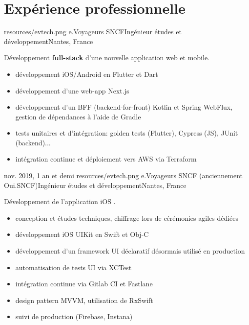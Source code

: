 \documentclass{cv}
\begin{document}
\section{Expérience professionnelle}

{resources/evtech.png}
{e.Voyageurs SNCF}{Ingénieur études et développement}{Nantes, France}{

Développement \textbf{full-stack} d'une nouvelle application web et mobile.

\begin{itemize}
	\item développement iOS/Android en Flutter et Dart
	\item développement d'une web-app Next.js
	\item développement d'un BFF (backend-for-front) Kotlin et Spring WebFlux, gestion de dépendances à l'aide de Gradle
	\item tests unitaires et d'intégration: golden tests (Flutter), Cypress (JS), JUnit (backend)...
	\item intégration continue et déploiement vers AWS via Terraform
\end{itemize}
}

\experience
{{nov. 2019,  1 an et demi}}
{resources/evtech.png}
{e.Voyageurs SNCF (anciennement Oui.SNCF)}{Ingénieur études et développement}{Nantes, France}{

Développement de l'application iOS \href{https://apps.apple.com/fr/app/oui-sncf-train-et-bus/id343889987}{\link{\ouisncf{}}}.

\begin{itemize}
	\item conception et études techniques, chiffrage lors de cérémonies agiles dédiées
	\item développement iOS UIKit en Swift et Obj-C
	\item développement d'un framework UI déclaratif désormais utilisé en production
	\item automatisation de tests UI via XCTest
	\item intégration continue via Gitlab CI et Fastlane
	\item design pattern MVVM, utilisation de RxSwift
	\item suivi de production (Firebase, Instana)
\end{itemize}
}
\end{document}
